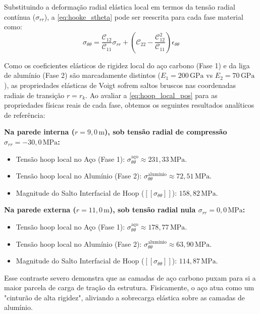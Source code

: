Substituindo a deformação radial elástica local em termos da tensão radial contínua ($\sigma_{rr}$), a \eqref{eq:hooke_stheta} pode ser reescrita para cada fase material como:
\begin{equation}
  \sigma_{\theta\theta} = \frac{\mathcal{C}_{12}}{\mathcal{C}_{11}} \sigma_{rr} + \left( \mathcal{C}_{22} - \frac{\mathcal{C}_{12}^2}{\mathcal{C}_{11}} \right) \epsilon_{\theta\theta}
  \label{eq:hoop_local_pos}
\end{equation}

Como os coeficientes elásticos de rigidez local do aço carbono (Fase 1) e da liga de alumínio (Fase 2) são marcadamente distintos ($E_1 = 200 \, \text{GPa}$ vs $E_2 = 70 \, \text{GPa}$), as propriedades elásticas de Voigt sofrem saltos bruscos nas coordenadas radiais de transição $r = r_k$. Ao avaliar a \eqref{eq:hoop_local_pos} para as propriedades físicas reais de cada fase, obtemos os seguintes resultados analíticos de referência:

\textbf{Na parede interna ($r = 9,0 \, \text{m}$), sob tensão radial de compressão $\sigma_{rr} = -30,0 \, \text{MPa}$:}
\begin{itemize}
  \item Tensão hoop local no Aço (Fase 1): $\sigma_{\theta\theta}^{\text{aço}} \approx 231,33 \, \text{MPa}$.
  \item Tensão hoop local no Alumínio (Fase 2): $\sigma_{\theta\theta}^{\text{alumínio}} \approx 72,51 \, \text{MPa}$.
  \item Magnitude do Salto Interfacial de Hoop ($[[\sigma_{\theta\theta}]]$): \textbf{$158,82 \, \text{MPa}$}.
\end{itemize}

\textbf{Na parede externa ($r = 11,0 \, \text{m}$), sob tensão radial nula $\sigma_{rr} = 0,0 \, \text{MPa}$:}
\begin{itemize}
  \item Tensão hoop local no Aço (Fase 1): $\sigma_{\theta\theta}^{\text{aço}} \approx 178,77 \, \text{MPa}$.
  \item Tensão hoop local no Alumínio (Fase 2): $\sigma_{\theta\theta}^{\text{alumínio}} \approx 63,90 \, \text{MPa}$.
  \item Magnitude do Salto Interfacial de Hoop ($[[\sigma_{\theta\theta}]]$): \textbf{$114,87 \, \text{MPa}$}.
\end{itemize}

Esse contraste severo demonstra que as camadas de aço carbono puxam para si a maior parcela de carga de tração da estrutura. Fisicamente, o aço atua como um "cinturão de alta rigidez", aliviando a sobrecarga elástica sobre as camadas de alumínio.

